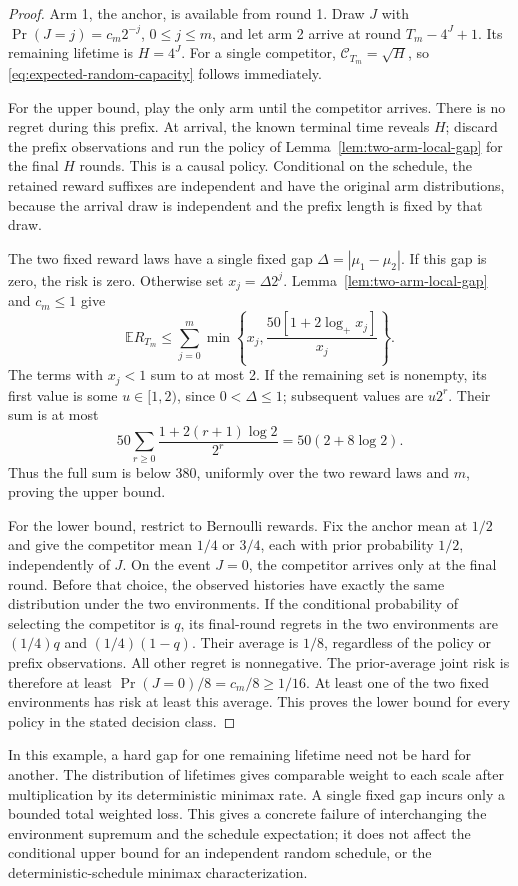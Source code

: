 \begin{proof}
Arm 1, the anchor, is available from round 1. Draw $J$ with
$\Pr(J=j)=c_m2^{-j}$, $0\le j\le m$, and let arm 2 arrive at
round $T_m-4^J+1$. Its remaining lifetime is $H=4^J$. For a single
competitor, $\mathscr C_{T_m}=\sqrt H$, so
\eqref{eq:expected-random-capacity} follows immediately.

For the upper bound, play the only arm until the competitor arrives.
There is no regret during this prefix. At arrival, the known terminal
time reveals $H$; discard the prefix observations and run the policy
of Lemma~\ref{lem:two-arm-local-gap} for the final $H$ rounds. This is
a causal policy. Conditional on the schedule, the retained reward
suffixes are independent and have the original arm distributions,
because the arrival draw is independent and the prefix length is
fixed by that draw.

The two fixed reward laws have a single fixed gap
$\Delta=|\mu_1-\mu_2|$. If this gap is zero, the risk is zero.
Otherwise set $x_j=\Delta2^j$. Lemma~\ref{lem:two-arm-local-gap}
and $c_m\le1$ give
\[
 \mathbb E R_{T_m}
 \le\sum_{j=0}^m
  \min\left\{x_j,
       \frac{50[1+2\log_+x_j]}{x_j}\right\}.
\]
The terms with $x_j<1$ sum to at most 2. If the remaining set is
nonempty, its first value is some $u\in[1,2)$, since $0<\Delta\le1$;
subsequent values are $u2^r$. Their sum is at most
\[
 50\sum_{r\ge0}\frac{1+2(r+1)\log2}{2^r}
       =50(2+8\log2).
\]
Thus the full sum is below 380, uniformly over the two reward laws and
$m$, proving the upper bound.

For the lower bound, restrict to Bernoulli rewards. Fix the anchor
mean at $1/2$ and give the competitor mean $1/4$ or $3/4$, each with
prior probability $1/2$, independently of $J$. On the event $J=0$,
the competitor arrives only at the final round. Before that choice,
the observed histories have exactly the same distribution under the
two environments. If the conditional probability of selecting the
competitor is $q$, its final-round regrets in the two environments
are $(1/4)q$ and $(1/4)(1-q)$. Their average is $1/8$, regardless of
the policy or prefix observations. All other regret is nonnegative.
The prior-average joint risk is therefore at least
$\Pr(J=0)/8=c_m/8\ge1/16$. At least one of the two fixed
environments has risk at least this average. This proves the lower
bound for every policy in the stated decision class.
\end{proof}

In this example, a hard gap for one remaining lifetime need not be
hard for another. The distribution of lifetimes gives comparable
weight to each scale after multiplication by its deterministic
minimax rate. A single fixed gap incurs only a bounded total
weighted loss. This gives a concrete failure of interchanging the
environment supremum and the schedule expectation; it does not
affect the conditional upper bound for an independent random
schedule, or the deterministic-schedule minimax characterization.

